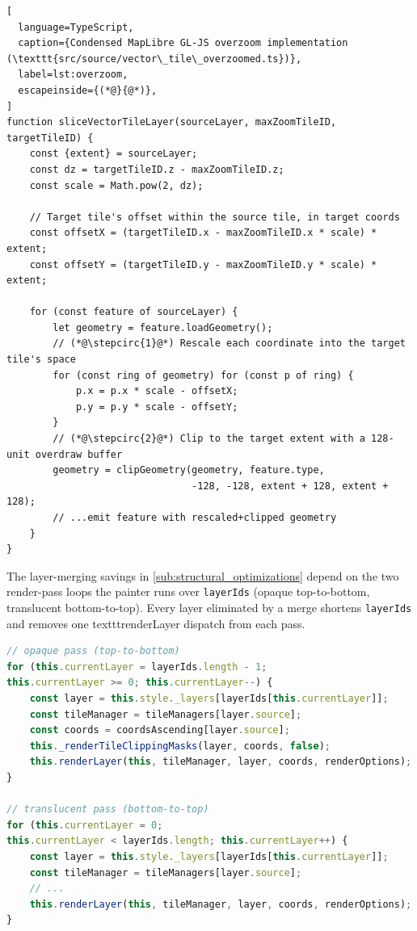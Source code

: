 \begin{lstlisting}[
  language=TypeScript,
  caption={Condensed MapLibre GL-JS overzoom implementation (\texttt{src/source/vector\_tile\_overzoomed.ts})},
  label=lst:overzoom,
  escapeinside={(*@}{@*)},
]
function sliceVectorTileLayer(sourceLayer, maxZoomTileID, targetTileID) {
    const {extent} = sourceLayer;
    const dz = targetTileID.z - maxZoomTileID.z;
    const scale = Math.pow(2, dz);

    // Target tile's offset within the source tile, in target coords
    const offsetX = (targetTileID.x - maxZoomTileID.x * scale) * extent;
    const offsetY = (targetTileID.y - maxZoomTileID.y * scale) * extent;

    for (const feature of sourceLayer) {
        let geometry = feature.loadGeometry();
        // (*@\stepcirc{1}@*) Rescale each coordinate into the target tile's space
        for (const ring of geometry) for (const p of ring) {
            p.x = p.x * scale - offsetX;
            p.y = p.y * scale - offsetY;
        }
        // (*@\stepcirc{2}@*) Clip to the target extent with a 128-unit overdraw buffer
        geometry = clipGeometry(geometry, feature.type,
                                -128, -128, extent + 128, extent + 128);
        // ...emit feature with rescaled+clipped geometry
    }
}
\end{lstlisting}

The layer-merging savings in \cref{sub:structural_optimizations} depend on the two render-pass loops the painter runs over \texttt{layerIds} (opaque top-to-bottom, translucent bottom-to-top).
Every layer eliminated by a merge shortens \texttt{layerIds} and removes one texttt{renderLayer} dispatch from each pass.

\begin{lstlisting}[language=TypeScript,caption={MapLibre GL-JS painter render loop (\texttt{src/render/painter.ts})},label=lst:painter_loop]
// opaque pass (top-to-bottom)
for (this.currentLayer = layerIds.length - 1;
this.currentLayer >= 0; this.currentLayer--) {
	const layer = this.style._layers[layerIds[this.currentLayer]];
	const tileManager = tileManagers[layer.source];
	const coords = coordsAscending[layer.source];
	this._renderTileClippingMasks(layer, coords, false);
	this.renderLayer(this, tileManager, layer, coords, renderOptions);
}

// translucent pass (bottom-to-top)
for (this.currentLayer = 0;
this.currentLayer < layerIds.length; this.currentLayer++) {
	const layer = this.style._layers[layerIds[this.currentLayer]];
	const tileManager = tileManagers[layer.source];
	// ...
	this.renderLayer(this, tileManager, layer, coords, renderOptions);
}
\end{lstlisting}

